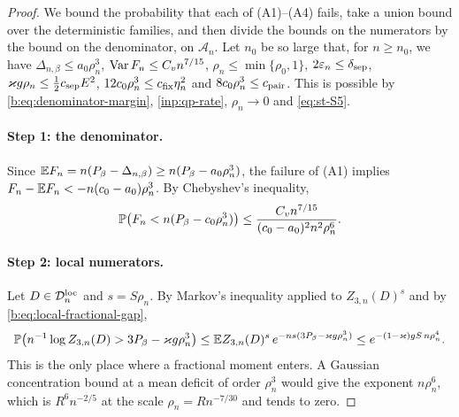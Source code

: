 \begin{proof}
We bound the probability that each of (A1)--(A4) fails, take a union bound over the deterministic families, and then divide the bounds on the numerators by the bound on the denominator, on $\mathcal A_n$. Let $n_0$ be so large that, for $n\ge n_0$, we have $\Delta_{n,\beta}\le a_0\rho_n^3$, $\operatorname{Var} F_n\le C_vn^{7/15}$, $\rho_n\le\min\{\rho_0,1\}$, $2\varepsilon_n\le\delta_{\rm sep}$, $\varkappa g\rho_n\le\frac12c_{\rm sep}E^2$, $12c_0\rho_n^3\le c_{\rm fix}\eta_n^2$ and $8c_0\rho_n^3\le c_{\rm pair}$. This is possible by \eqref{b:eq:denominator-margin}, \cref{inp:qp-rate}, $\rho_n\to0$ and \eqref{eq:st-S5}.

\paragraph{Step 1: the denominator.} Since $\mathbb E F_n=n(P_\beta-\Delta_{n,\beta})\ge n(P_\beta-a_0\rho_n^3)$, the failure of (A1) implies $F_n-\mathbb E F_n<-n(c_0-a_0)\rho_n^3$. By Chebyshev's inequality,
\[
 \mathbb P\bigl(F_n<n(P_\beta-c_0\rho_n^3)\bigr)\le\frac{C_vn^{7/15}}{(c_0-a_0)^2n^2\rho_n^6}.
\]

\paragraph{Step 2: local numerators.} Let $D\in\mathcal D^{\rm loc}_n$ and $s=S\rho_n$. By Markov's inequality applied to $Z_{3,n}(D)^s$ and by \eqref{b:eq:local-fractional-gap},
\[
 \mathbb P\bigl(n^{-1}\log Z_{3,n}(D)>3P_\beta-\varkappa g\rho_n^3\bigr)
 \le\mathbb E Z_{3,n}(D)^s\,e^{-ns(3P_\beta-\varkappa g\rho_n^3)}
 \le e^{-(1-\varkappa)gS\,n\rho_n^4}.
\]
This is the only place where a fractional moment enters. A Gaussian concentration bound at a mean deficit of order $\rho_n^3$ would give the exponent $n\rho_n^6$, which is $R^6n^{-2/5}$ at the scale $\rho_n=Rn^{-7/30}$ and tends to zero.


\end{proof}
